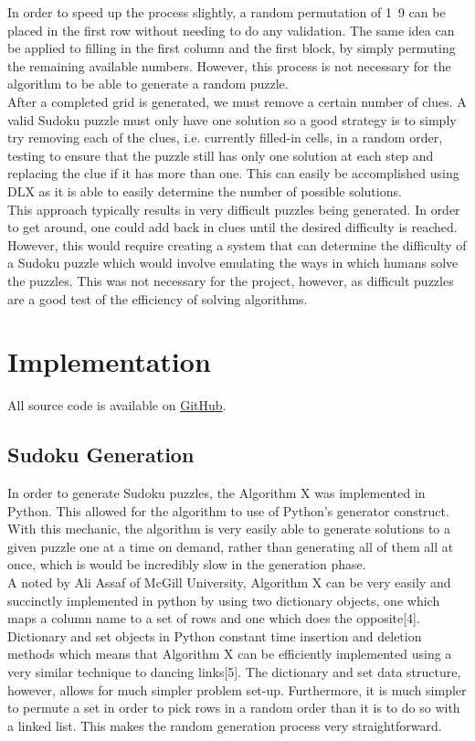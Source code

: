\documentclass[12pt]{article}
\newcounter{row}
\newcounter{col}
\begin{document}
In order to speed up the process slightly, a random permutation of 1~9 can be placed in the first row without needing to do any validation. The same idea can be applied to filling in the first column and the first block, by simply permuting the remaining available numbers. However, this process is not necessary for the algorithm to be able to generate a random puzzle.\\

After a completed grid is generated, we must remove a certain number of clues. A valid Sudoku puzzle must only have one solution so a good strategy is to simply try removing each of the clues, i.e. currently filled-in cells, in a random order, testing to ensure that the puzzle still has only one solution at each step and replacing the clue if it has more than one. This can easily be accomplished using DLX as it is able to easily determine the number of possible solutions. \\

This approach typically results in very difficult puzzles being generated. In order to get around, one could add back in clues until the desired difficulty is reached. However, this would require creating a system that can determine the difficulty of a Sudoku puzzle which would involve emulating the ways in which humans solve the puzzles. This was not necessary for the project, however, as difficult puzzles are a good test of the efficiency of solving algorithms.

\section{Implementation}
All source code is available on \href{https://github.com/smaskell/Sudoku}{GitHub}.
\subsection{Sudoku Generation}
In order to generate Sudoku puzzles, the Algorithm X was implemented in Python. This allowed for the algorithm to use of Python's generator construct. With this mechanic, the algorithm is very easily able to generate solutions to a given puzzle one at a time on demand, rather than generating all of them all at once, which is would be incredibly slow in the generation phase. \\

A noted by Ali Assaf of McGill University, Algorithm X can be very easily and succinctly implemented in python by using two dictionary objects, one which maps a column name to a set of rows and one which does the opposite[4]. Dictionary and set objects in Python constant time insertion and deletion methods which means that Algorithm X can be efficiently implemented using a very similar technique to dancing links[5]. The dictionary and set data structure, however, allows for much simpler problem set-up. Furthermore, it is much simpler to permute a set in order to pick rows in a random order than it is to do so with a linked list. This makes the random generation process  very straightforward.\\
\end{document}
